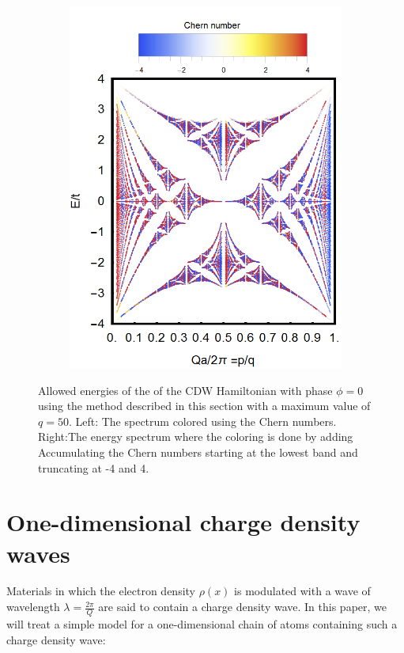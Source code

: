 \documentclass[letterpaper, 10 pt, conference]{ieeeconf}  %
\begin{document}
\begin{figure}[tbph]
\begin{subfigure}{.1\linewidth}
\includegraphics{butterfly50ChernAccuTotal.png}
\label{fig:sub2}
\end{subfigure}
\caption{Allowed energies of the of the CDW Hamiltonian with phase $\phi = 0$ using the method described in this section with a  maximum value of $q = 50$.
Left: The spectrum colored using the Chern numbers.
Right:The energy spectrum where the coloring is done by adding Accumulating the Chern numbers starting at the lowest band and truncating at -4 and 4.}
\end{figure}

\section{One-dimensional charge density waves}

Materials in which the electron density $\rho(x)$ is modulated with a wave of
wavelength $\lambda = \frac{2\pi}{Q}$ are said to contain a charge density wave.
In this paper, we will treat a simple model for a one-dimensional chain of atoms containing such a charge density wave:
\end{document}
